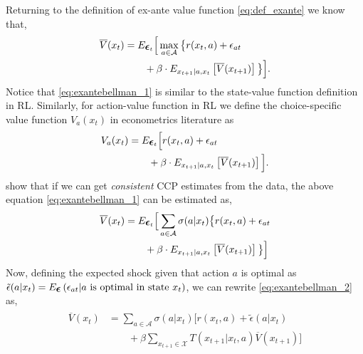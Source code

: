 \documentclass{article}
\renewcommand{\vec}[1]{\mbox{\bm{$#1$}}}
\begin{document}
Returning to the definition of ex-ante value function \eqref{eq:def_exante} we know that,
\begin{align} \label{eq:exantebellman_1}
\begin{split}
\overline{V}(x_t) & = E_{\vec{\epsilon}_t}\Big[\max_{a\in\mathcal{A}} \big\{r(x_t,a)+\epsilon_{at} \\
& \qquad +\beta  \cdot E_{x_{t+1}|a,x_t} \left[ \overline{V}(x_{t+1}) \right] \big\}\Big].\\
\end{split}
\end{align}
Notice that \eqref{eq:exantebellman_1} is similar to the state-value function definition in RL. Similarly, for action-value function in RL we define the choice-specific value function $V_a(x_t)$ in econometrics literature as
\begin{align}
\begin{split}
V_a(x_t) &= E_{\vec{\epsilon}_t}\Big[r(x_t,a)+\epsilon_{at} \\
& \qquad +\beta  \cdot E_{x_{t+1}|a,x_t} \left[ \overline{V}(x_{t+1}) \right] \Big].\\
\end{split}
\end{align}
\cite{hotz} show that if we can get \textit{consistent} CCP estimates from the data, the above equation \eqref{eq:exantebellman_1} can be estimated as,
\begin{align} \label{eq:exantebellman_2}
\begin{split}
\overline{V}(x_t) & = E_{\vec{\epsilon}_t}\Big[\sum_{a\in\mathcal{A}} \sigma(a|x_t) \big\{r(x_t,a)+\epsilon_{at} \\
& \qquad +\beta  \cdot E_{x_{t+1}|a,x_t} \left[ \overline{V}(x_{t+1}) \right] \big\}\Big]\\
\end{split}
\end{align}
Now, defining the expected shock given that action $a$ is optimal as $\tilde{\epsilon}(a|x_t) = E_{\vec{\epsilon}}\left( \epsilon_{at} |a\ \textrm{is optimal in state } x_t\right)$, we can rewrite \eqref{eq:exantebellman_2} as,
\begin{align} \label{eq:exantebellman_3}
\begin{split}
\overline{V}(x_t) & = \sum_{a\in\mathcal{A}} \sigma(a|x_t) \Big[r(x_t,a)+\tilde{\epsilon}(a|x_t) \\
& \qquad +\beta \sum_{x_{t+1}\in\mathcal{X}} T(x_{t+1}|x_t,a) \overline{V}(x_{t+1})\Big]
\end{split}
\end{align}
\end{document}
